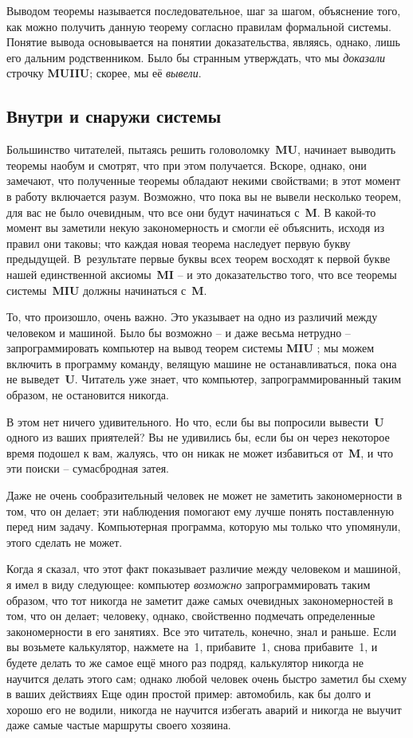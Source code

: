 \documentclass[../main.tex]{subfiles}
\begin{document}
Выводом теоремы называется последовательное, шаг за шагом, объяснение того, как можно получить данную теорему согласно правилам формальной системы. Понятие вывода основывается на понятии доказательства, являясь, однако, лишь его дальним родственником. Было бы странным утверждать, что мы \emph{доказали} строчку \textbf{MUIIU}; скорее, мы её \emph{вывели}.


\subsection{Внутри и снаружи системы}

Большинство читателей, пытаясь решить головоломку~\textbf{MU}, начинает выводить теоремы наобум и смотрят, что при этом получается. Вскоре, однако, они замечают, что полученные теоремы обладают некими свойствами; в этот момент в работу включается разум. Возможно, что пока вы не вывели несколько теорем, для вас не было очевидным, что все они будут начинаться с~\textbf{M}\@. В какой-то момент вы заметили некую закономерность и смогли её объяснить, исходя из правил они таковы; что каждая новая теорема наследует первую букву предыдущей. В~результате первые буквы всех теорем восходят к первой букве нашей единственной аксиомы~\textbf{MI} \--- и это доказательство того, что все теоремы системы~\textbf{MIU} должны начинаться с~\textbf{M}.

То, что произошло, очень важно. Это указывает на одно из различий между человеком и машиной. Было бы возможно \--- и даже весьма нетрудно \--- запрограммировать компьютер на вывод теорем системы \textbf{MIU} ; мы можем включить в программу команду, велящую машине не останавливаться, пока она не выведет~\textbf{U}\@. Читатель уже знает, что компьютер, запрограммированный таким образом, не остановится никогда.

В этом нет ничего удивительного. Но что, если бы вы попросили вывести~\textbf{U} одного из ваших приятелей? Вы не удивились бы, если бы он через некоторое время подошел к вам, жалуясь, что он никак не может избавиться от~\textbf{M}, и что эти поиски \--- сумасбродная затея.

Даже не очень сообразительный человек не может не заметить закономерности в том, что он делает; эти наблюдения помогают ему лучше понять поставленную перед ним задачу. Компьютерная программа, которую мы только что упомянули, этого сделать не может.

Когда я сказал, что этот факт показывает различие между человеком и машиной, я имел в виду следующее: компьютер \emph{возможно} запрограммировать таким образом, что тот никогда не заметит даже самых очевидных закономерностей в том, что он делает; человеку, однако, свойственно подмечать определенные закономерности в его занятиях. Все это читатель, конечно, знал и раньше. Если вы возьмете калькулятор, нажмете на~1, прибавите~1, снова прибавите~1, и будете делать то же самое ещё много раз подряд, калькулятор никогда не научится делать этого сам; однако любой человек очень быстро заметил бы схему в ваших действиях Еще один простой пример: автомобиль, как бы долго и хорошо его не водили, никогда не научится избегать аварий и никогда не выучит даже самые частые маршруты своего хозяина.
\end{document}
